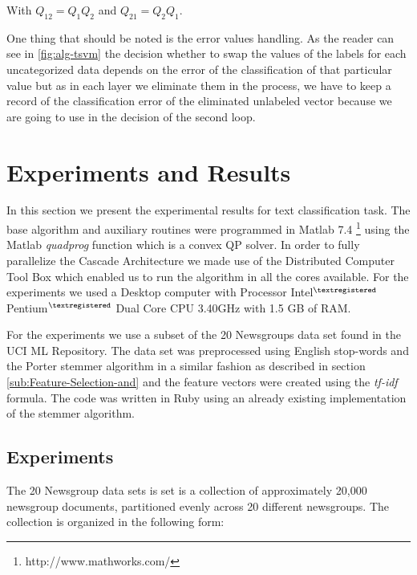 With $Q_{12}=Q_{1}Q_{2}$ and $Q_{21}=Q_{2}Q_{1}$. 

One thing that should be noted is the error values handling. As the
reader can see in \ref{fig:alg-tsvm} the decision whether to swap
the values of the labels for each uncategorized data depends on the
error of the classification of that particular value but as in each
layer we eliminate them in the process, we have to keep a record of
the classification error of the eliminated unlabeled vector because
we are going to use in the decision of the second loop.
%



\chapter{Experiments and Results}

In this section we present the experimental results for text classification
task. The base algorithm and auxiliary routines were programmed in
Matlab 7.4%
\footnote{http://www.mathworks.com/%
} using the Matlab \emph{quadprog} function which is a convex QP solver.
In order to fully parallelize the Cascade Architecture we made use
of the Distributed Computer Tool Box which enabled us to run the algorithm
in all the cores available. For the experiments we used a Desktop
computer with Processor Intel$^{\textregistered}$ Pentium$^{\textregistered}$
Dual Core CPU 3.40GHz with 1.5 GB of RAM.

For the experiments we use a subset of the 20 Newsgroups \cite{20news}
data set found in the UCI ML Repository\cite{Asuncion+Newman:2007}.
The data set was preprocessed using English stop-words and the Porter
stemmer algorithm \cite{Porter80} in a similar fashion as described
in section \ref{sub:Feature-Selection-and} and the feature vectors
were created using the \emph{tf-idf} formula. The code was written
in Ruby using an already existing implementation of the stemmer algorithm. 


\section{Experiments}

The 20 Newsgroup data sets is set is a collection of approximately
20,000 newsgroup documents, partitioned evenly across 20 different
newsgroups. The collection is organized in the following form:\\ 

